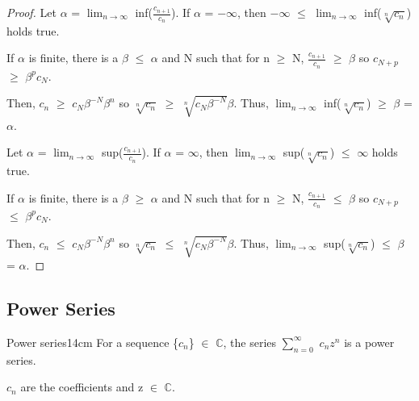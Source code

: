     \begin{proof}
        Let $\alpha$ = $\lim_{n \rightarrow \infty}$ inf($\frac{c_{n+1}}{c_n}$).
        If $\alpha$ = $-\infty$, then $-\infty$ $\leq$
        $\lim_{n \rightarrow \infty}$ inf($\sqrt[n]{c_n}$) holds true.

        If $\alpha$ is finite, there is a $\beta$ $\leq$ $\alpha$ and N such that
        for n $\geq$ N, $\frac{c_{n+1}}{c_n}$ $\geq$ $\beta$
        so $c_{N+p}$ $\geq$ $\beta^p c_N$.

        Then, $c_{n}$ $\geq$ $c_N \beta^{-N} \beta^n$ so
        $\sqrt[n]{c_{n}}$ $\geq$ $\sqrt[n]{c_N \beta^{-N}} \beta$.
        Thus, $\lim_{n \rightarrow \infty}$ inf($\sqrt[n]{c_n}$)
        $\geq$ $\beta$ = $\alpha$.

        \vspace{0.2cm}

        Let $\alpha$ = $\lim_{n \rightarrow \infty}$ sup($\frac{c_{n+1}}{c_n}$).
        If $\alpha$ = $\infty$, then
        $\lim_{n \rightarrow \infty}$ sup($\sqrt[n]{c_n}$)
        $\leq$ $\infty$ holds true.

        If $\alpha$ is finite, there is a $\beta$ $\geq$ $\alpha$ and N such that
        for n $\geq$ N, $\frac{c_{n+1}}{c_n}$ $\leq$ $\beta$
        so $c_{N+p}$ $\leq$ $\beta^p c_N$.

        Then, $c_{n}$ $\leq$ $c_N \beta^{-N} \beta^n$ so
        $\sqrt[n]{c_{n}}$ $\leq$ $\sqrt[n]{c_N \beta^{-N}} \beta$.
        Thus, $\lim_{n \rightarrow \infty}$ sup($\sqrt[n]{c_n}$)
        $\leq$ $\beta$ = $\alpha$.
    \end{proof}

    \newpage





\subsection{ Power Series }

    \begin{definition}{Power series}{14cm}
        For a sequence \{$c_n$\} $\in$ $\mathbb{C}$, the series
        $\sum_{n=0}^{\infty}$ $c_n z^n$
        is a power series.

        $c_n$ are the coefficients and z $\in$ $\mathbb{C}$.
    \end{definition}

    \vspace{0.5cm}



